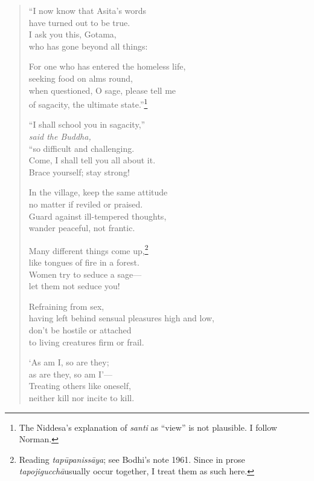 \documentclass[12pt,openany]{book}%
\newcommand*{\scspeaker}[1]{\hspace{2em}\textit{#1}}
\begin{document}
\begin{verse}%
“I now know that Asita’s words \\
have turned out to be true. \\
I ask you this, Gotama, \\
who has gone beyond all things: 

For one who has entered the homeless life, \\
seeking food on alms round, \\
when questioned, O sage, please tell me \\
of sagacity, the ultimate state.”\footnote{The Niddesa’s explanation of \textit{santi} as “view” is not plausible. I follow Norman. } 

“I shall school you in sagacity,” \\
\scspeaker{said the Buddha, }\\
“so difficult and challenging. \\
Come, I shall tell you all about it. \\
Brace yourself; stay strong! 

In the village, keep the same attitude \\
no matter if reviled or praised. \\
Guard against ill-tempered thoughts, \\
wander peaceful, not frantic. 

Many different things come up,\footnote{Reading \textit{\textsanskrit{tapūpanissāya}}; see Bodhi’s note 1961. Since in prose \textit{\textsanskrit{tapojigucchā}}usually occur together, I treat them as such here. } \\
like tongues of fire in a forest. \\
Women try to seduce a sage—\\
let them not seduce you! 

Refraining from sex, \\
having left behind sensual pleasures high and low, \\
don’t be hostile or attached \\
to living creatures firm or frail. 

‘As am I, so are they; \\
as are they, so am I’—\\
Treating others like oneself, \\
neither kill nor incite to kill. 


\end{verse}
\end{document}
